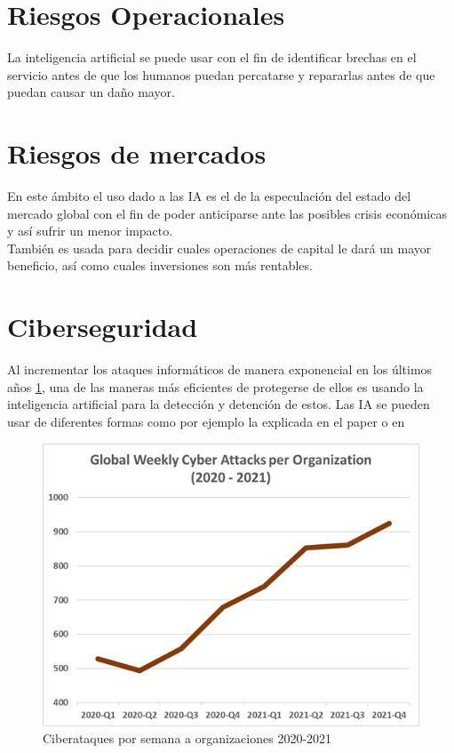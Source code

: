 \documentclass[12pt, a4paper]{report}
\begin{document}
\section{Riesgos Operacionales}
La inteligencia artificial se puede usar con el fin de identificar brechas en el servicio antes de que los humanos puedan percatarse y repararlas antes de que puedan causar un daño mayor.
\section{Riesgos de mercados}
En este ámbito el uso dado a las IA es el de la especulación del estado del mercado global con el fin de poder anticiparse ante las posibles crisis económicas y así sufrir un menor impacto.\\
También es usada para decidir cuales operaciones de capital le dará un mayor beneficio, así como cuales inversiones son más rentables.
\section{Ciberseguridad}
Al incrementar los ataques informáticos de manera exponencial en los últimos años \ref{ciberataques}, una de las maneras más eficientes de protegerse de ellos es usando la inteligencia artificial para la detección y detención de estos. Las IA se pueden usar de diferentes formas como por ejemplo la explicada en el paper \cite{ciber} o en \cite{ciber video}
\begin{figure}[H]
	\centering
	\includegraphics[scale=0.5]{ciberataques}
	\caption{Ciberataques por semana a organizaciones 2020-2021}
	\label{ciberataques}
\end{figure}
\end{document}
